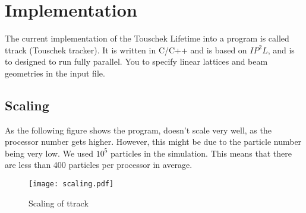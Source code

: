 \pagebreak
\section{Implementation}
The current implementation of the Touschek Lifetime into a program is called ttrack (Touschek tracker). It is written in C/C++ and is based on $IP^2L$, and is to designed to run fully parallel. You to specify linear lattices and beam geometries in the input file.
\subsection{Scaling}
As the following figure shows the program, doesn't scale very well, as the processor number gets higher. However, this might be due to the particle number being very low. We used $10^5$ particles in the simulation. This means that there are less than 400 particles per processor in average.
\begin{figure}[here]
\centering
 \texttt{[image: scaling.pdf]}
 \caption{Scaling of ttrack}
\end{figure}
